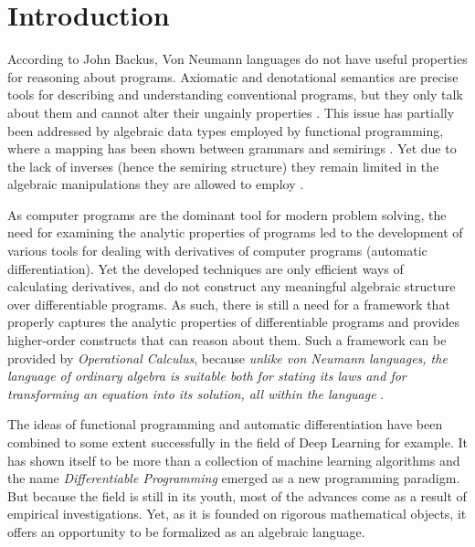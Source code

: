 \section{Introduction}

According to John Backus, Von Neumann languages do not have useful properties for reasoning about programs. Axiomatic and denotational semantics are precise tools for describing and understanding conventional programs, but they only talk about them and cannot alter their ungainly
properties \cite{backus}. This issue has partially been addressed by algebraic data types employed by functional programming, where a mapping has been shown between grammars and semirings \cite{7Trees}.
Yet due to the lack of inverses (hence the semiring structure) they remain limited in the algebraic manipulations they are allowed to employ \cite{complexCat}.

As computer programs are the dominant tool for modern problem solving, the need for examining the analytic properties of programs led to the development of various tools for dealing with derivatives of computer programs (automatic differentiation). Yet the developed techniques are only efficient ways of calculating derivatives, and do not construct any meaningful algebraic structure over differentiable programs. As such, there is still a need for a framework that properly captures the analytic properties of differentiable programs and provides higher-order constructs that can reason about them. Such a framework can be provided by \emph{Operational Calculus}, because \emph{unlike von Neumann languages, the language of ordinary algebra is suitable both for stating its laws and for transforming an equation into its solution, all within the language} \cite{backus}.

The ideas of functional programming and automatic differentiation have been combined to some extent successfully in the field of Deep Learning for example. It has shown itself to be more than a collection of machine learning algorithms and the name \emph{Differentiable Programming} emerged as a new programming paradigm. But because the field is still in its youth, most of the advances come as a result of empirical investigations. Yet, as it is founded on rigorous mathematical objects, it offers an opportunity to be formalized as an algebraic language.

